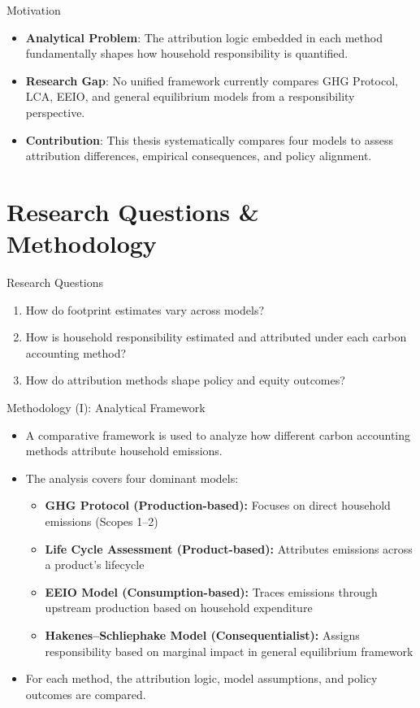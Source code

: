 \documentclass{beamer}
\begin{document}
\begin{frame}{Motivation}
\vspace{1em}
\begin{itemize}
\item \small \textbf{Analytical Problem}: The attribution logic embedded in each method fundamentally shapes how household responsibility is quantified.\\
\item \small \textbf{Research Gap}: No unified framework currently compares GHG Protocol, LCA, EEIO, and general equilibrium models from a responsibility perspective.\\
\item \small \textbf{Contribution}: This thesis systematically compares four models to assess attribution differences, empirical consequences, and policy alignment.
\end{itemize}
\end{frame}



\section{Research Questions \& Methodology}
\begin{frame}{Research Questions}
\begin{enumerate}
  \item How do footprint estimates vary across models?
  \item How is household responsibility estimated and attributed under each carbon accounting method?
  \item How do attribution methods shape policy and equity outcomes?
\end{enumerate}
\end{frame}

\begin{frame}{Methodology (I): Analytical Framework}
\small
\vspace{-2.0em}
\begin{itemize}
  \item A comparative framework is used to analyze how different carbon accounting methods attribute household emissions.
  \item The analysis covers four dominant models:
  \begin{itemize}
    \item \textbf{GHG Protocol (Production-based):} Focuses on direct household emissions (Scopes 1–2)
    \item \textbf{Life Cycle Assessment (Product-based):} Attributes emissions across a product's lifecycle
    \item \textbf{EEIO Model (Consumption-based):} Traces emissions through upstream production based on household expenditure
    \item \textbf{Hakenes–Schliephake Model (Consequentialist):} Assigns responsibility based on marginal impact in general equilibrium framework
  \end{itemize}
  \item For each method, the attribution logic, model assumptions, and policy outcomes are compared.
\end{itemize}
\end{frame}
\end{document}
